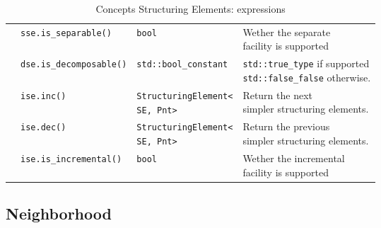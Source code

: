 \begin{table}[!htbp]
\begin{scriptsize}
\begin{tabular}{llll}
      \multicolumn{1}{c|}{}                                     & \texttt{sse.is\_separable()}                          & \texttt{bool}                             & \makecell[l]{Wether the separate        \\ facility is supported}\\
      \cline{1-4}
      \multicolumn{1}{c|}{\multirow{4}{*}{\makecell[l]{Incremental                                                                                                                                            \\StructuringElement}}} & \texttt{dse.is\_decomposable()} & \texttt{std::bool\_constant} & \makecell[l]{\texttt{std::true\_type} if supported\\ \texttt{std::false\_false} otherwise.}\\
      \multicolumn{1}{c|}{}                                     & \texttt{ise.inc()}                                    & \makecell[l]{\texttt{StructuringElement<}                                           \\\texttt{SE, Pnt>}} & \makecell[l]{Return the next            \\ simpler structuring elements.}\\
      \multicolumn{1}{c|}{}                                     & \texttt{ise.dec()}                                    & \makecell[l]{\texttt{StructuringElement<}                                           \\\texttt{SE, Pnt>}} & \makecell[l]{Return the previous        \\ simpler structuring elements.}\\
      \multicolumn{1}{c|}{}                                     & \texttt{ise.is\_incremental()}                        & \texttt{bool}                             & \makecell[l]{Wether the incremental     \\ facility is supported}\\
      \cline{1-4}
    \end{tabular}
    \smallskip

    \caption{Concepts Structuring Elements: expressions}
  \end{scriptsize}
  \label{concept.tables.se.expressions}
\end{table}

\subsection{Neighborhood}
\label{image_and_algorithms_taxonomy.concepts.subsec.neighborhood}

